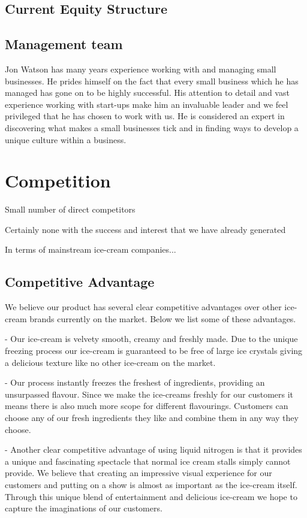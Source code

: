 \documentclass{article}
\begin{document}
  \subsection{Current Equity Structure}

  \subsection{Management team}

Jon Watson has many years experience working with and managing small
businesses. He prides himself on the fact that every small business which he has managed has gone on to be highly successful. His attention to detail and vast experience working with start-ups make him an invaluable leader and we feel privileged that he has chosen to work with us. He is considered an expert in discovering what makes a small businesses tick and in finding ways to develop a unique culture within a business.


\section{Competition}
  Small number of direct competitors

  Certainly none with the success and interest that we have already generated

  In terms of mainstream ice-cream companies...


  \subsection{Competitive Advantage}

We believe our product has several clear competitive advantages over
other ice-cream brands currently on the market. Below we list some of these advantages.

 - Our ice-cream is velvety smooth, creamy and freshly made. Due to
the unique freezing process our ice-cream is guaranteed to be free of
large ice crystals giving a delicious texture like no other ice-cream on the
market.

 - Our process instantly freezes the freshest of ingredients, providing
an unsurpassed flavour. Since we make the ice-creams freshly for
our customers it means there is also much more scope for different
flavourings. Customers can choose any of our fresh ingredients they like and combine them in any way they choose.

 - Another clear competitive advantage of using liquid nitrogen is that
it provides a unique and fascinating spectacle that normal ice cream
stalls simply cannot provide. We believe that creating an impressive
visual experience for our customers and putting on a show is almost
as important as the ice-cream itself. Through this unique blend
of entertainment and delicious ice-cream we hope to capture the
imaginations of our customers.
\end{document}
